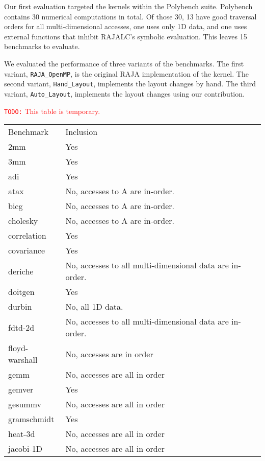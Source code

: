 \documentclass[sigconf, table]{acmart}
\newcommand{\todo}[1]{{\textcolor{red}{{\tt{TODO:}}\,\,#1 }}}
\begin{document}
Our first evaluation targeted the kernels within the Polybench suite. 
Polybench contains 30 numerical computations in total. 
Of those 30, 13 have good traversal orders for all multi-dimensional accesses, one uses only 1D data, and one uses external functions that inhibit RAJALC's symbolic evaluation.
This leaves 15 benchmarks to evaluate.

We evaluated the performance of three variants of the benchmarks.
The first variant, \verb.RAJA_OpenMP., is the original RAJA implementation of the kernel.
The second variant, \verb.Hand_Layout., implements the layout changes by hand.
The third variant, \verb.Auto_Layout., implements the layout changes using our contribution.



\todo{This table is temporary.}
\begin{figure*}
\begin{tabular}{ll}
Benchmark   & Inclusion \\
2mm         & Yes          \\
3mm         & Yes          \\
adi         & Yes          \\
atax        & No, accesses to A are in-order.          \\
bicg        & No, accesses to A are in-order.          \\
cholesky    & No, accesses to A are in-order.          \\
correlation & Yes          \\
covariance  & Yes          \\
deriche     & No, accesses to all multi-dimensional data are in-order.          \\
doitgen     & Yes          \\
durbin      & No, all 1D data.          \\
fdtd-2d     & No, accesses to all multi-dimensional data are in-order.           \\
floyd-warshall & No, accesses are in order \\
gemm        &  No, accesses are all in order         \\
gemver      & Yes          \\
gesummv     & No, accesses are all in order          \\
gramschmidt & Yes          \\
heat-3d     & No, accesses are all in order            \\
jacobi-1D   & No, accesses are all in order           \\

\end{tabular}
\end{figure*}
\end{document}
